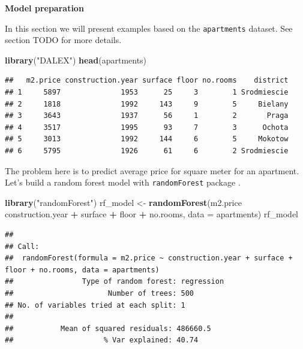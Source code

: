 \documentclass[]{book}
\newenvironment{Shaded}{\begin{snugshade}}{\end{snugshade}}
\newcommand{\DataTypeTok}[1]{\textcolor[rgb]{0.13,0.29,0.53}{#1}}
\newcommand{\KeywordTok}[1]{\textcolor[rgb]{0.13,0.29,0.53}{\textbf{#1}}}
\newcommand{\NormalTok}[1]{#1}
\newcommand{\OperatorTok}[1]{\textcolor[rgb]{0.81,0.36,0.00}{\textbf{#1}}}
\newcommand{\StringTok}[1]{\textcolor[rgb]{0.31,0.60,0.02}{#1}}
\theoremstyle{definition}
\theoremstyle{definition}
\theoremstyle{definition}
\theoremstyle{remark}
\begin{document}
\textbf{Model preparation}

In this section we will present examples based on the
\texttt{apartments} dataset. See section TODO for more details.

\begin{Shaded}
\begin{Highlighting}[]
\KeywordTok{library}\NormalTok{(}\StringTok{"DALEX"}\NormalTok{)}
\KeywordTok{head}\NormalTok{(apartments)}
\end{Highlighting}
\end{Shaded}

\begin{verbatim}
##   m2.price construction.year surface floor no.rooms    district
## 1     5897              1953      25     3        1 Srodmiescie
## 2     1818              1992     143     9        5     Bielany
## 3     3643              1937      56     1        2       Praga
## 4     3517              1995      93     7        3      Ochota
## 5     3013              1992     144     6        5     Mokotow
## 6     5795              1926      61     6        2 Srodmiescie
\end{verbatim}

The problem here is to predict average price for square meter for an
apartment. Let's build a random forest model with \texttt{randomForest}
package \citep{R-randomForest}.

\begin{Shaded}
\begin{Highlighting}[]
\KeywordTok{library}\NormalTok{(}\StringTok{"randomForest"}\NormalTok{)}
\NormalTok{rf_model <-}\StringTok{ }\KeywordTok{randomForest}\NormalTok{(m2.price }\OperatorTok{~}\StringTok{ }\NormalTok{construction.year }\OperatorTok{+}\StringTok{ }\NormalTok{surface }\OperatorTok{+}\StringTok{ }\NormalTok{floor }\OperatorTok{+}
\StringTok{      }\NormalTok{no.rooms, }\DataTypeTok{data =}\NormalTok{ apartments)}
\NormalTok{rf_model}
\end{Highlighting}
\end{Shaded}

\begin{verbatim}
## 
## Call:
##  randomForest(formula = m2.price ~ construction.year + surface +      floor + no.rooms, data = apartments) 
##                Type of random forest: regression
##                      Number of trees: 500
## No. of variables tried at each split: 1
## 
##           Mean of squared residuals: 486660.5
##                     % Var explained: 40.74
\end{verbatim}
\end{document}
